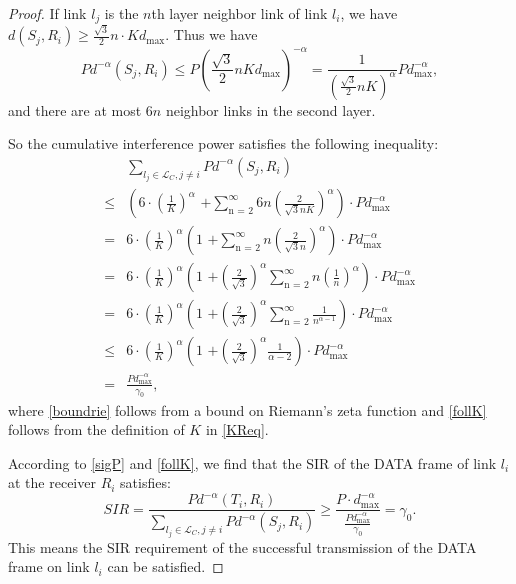 \documentclass[conference]{IEEEtran}
\begin{document}
\begin{proof}
If link $l_j$ is the $n$th layer neighbor link of link $l_i$, we
have $d(S_j,R_i)\geq \frac{\sqrt{3}}{2}n\cdot Kd_{\max }$. Thus we
have
\begin{equation*}
{Pd^{ - \alpha }\left( {S_j ,R_i } \right)}  \leq
{P{\left(\frac{\sqrt{3}}{2}n Kd_{\max }\right)}^{ - \alpha }}
=\frac{1}{\left(\frac{\sqrt{3}}{2}n K\right)^{\alpha}} P{d_{\max
}^{- \alpha }},
\end{equation*}
and there are at most $6n$ neighbor links in the second layer.

So the cumulative interference power satisf\/ies the following
inequality:
\begin{align}
&{\sum\limits_{l_j\in \mathcal{L}_C,j \ne i} {Pd^{ - \alpha }\left(
{S_j ,R_i } \right)} }\nonumber\\
\leq &\left(6 \cdot \left( {\frac{1}{K}} \right)^\alpha \mbox{ +
}\sum\limits_{\mbox{n = 2}}^\infty {6n\left( {\frac{2}{\sqrt 3 nK}}
\right)^\alpha }\right)\cdot P{d_{\max }^{- \alpha }} \nonumber\\
= & 6 \cdot \left( {\frac{1}{K}} \right)^\alpha \left( {\mbox{1 +
}\sum\limits_{\mbox{n = 2}}^\infty {n\left( {\frac{2}{\sqrt 3 n}}
\right)^\alpha } } \right)\cdot P{d_{\max }^{- \alpha }}\nonumber\\
= &6 \cdot \left( {\frac{1}{K}} \right)^\alpha \left( {\mbox{1 +
}\left( {\frac{2}{\sqrt 3 }} \right)^\alpha \sum\limits_{\mbox{n =
2}}^\infty {n\left( {\frac{1}{n}} \right)^\alpha } } \right)\cdot
P{d_{\max }^{- \alpha }}\nonumber\\
= &6 \cdot \left( {\frac{1}{K}} \right)^\alpha \left( {\mbox{1 +
}\left( {\frac{2}{\sqrt 3 }} \right)^\alpha \sum\limits_{\mbox{n =
2}}^\infty {\frac{1}{n^{\alpha - 1}}} } \right)\cdot P{d_{\max }^{-
\alpha }}\nonumber\\
\le & 6 \cdot \left( {\frac{1}{K}} \right)^\alpha \left( {\mbox{1 +
}\left( {\frac{2}{\sqrt 3 }} \right)^\alpha \frac{1}{\alpha - 2}}
\right)\cdot P{d_{\max }^{- \alpha }}\label{boundrie}\\
=&\frac{P{d_{\max }^{- \alpha }}}{\gamma_0},\label{follK}
\end{align}
where \eqref{boundrie} follows from a bound on Riemann's zeta
function and \eqref{follK} follows from the definition of $K$ in
\eqref{KReq}.

According to \eqref{sigP} and \eqref {follK}, we find that the SIR
of the DATA frame of link $l_i$ at the receiver $R_i$ satisf\/ies:
\begin{equation}
SIR=\frac{Pd^{ - \alpha }\left( {T_i ,R_i }
\right)}{\sum\limits_{l_j\in \mathcal{L}_C,j \ne i} {Pd^{ - \alpha
}\left( {S_j ,R_i } \right)} } \geq \frac{P\cdot{d_{\max }^{- \alpha
}}}{\frac{P{d_{\max }^{- \alpha }}}{\gamma_0}}=\gamma_0.
\end{equation}
This means the SIR requirement of the successful transmission of the
DATA frame on link $l_i$ can be satisf\/ied.


\end{proof}
\end{document}
